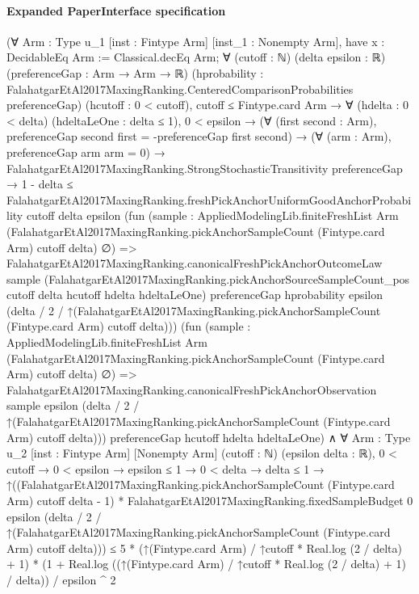 \documentclass[10pt]{article}
\begin{document}
\paragraph{Expanded PaperInterface specification}
\begin{ReviewVerbatim}
(∀ {Arm : Type u_1} [inst : Fintype Arm] [inst_1 : Nonempty Arm],
    have x : DecidableEq Arm := Classical.decEq Arm;
    ∀ (cutoff : ℕ) (delta epsilon : ℝ) (preferenceGap : Arm → Arm → ℝ)
      (hprobability : FalahatgarEtAl2017MaxingRanking.CenteredComparisonProbabilities preferenceGap)
      (hcutoff : 0 < cutoff),
      cutoff ≤ Fintype.card Arm →
        ∀ (hdelta : 0 < delta) (hdeltaLeOne : delta ≤ 1),
          0 < epsilon →
            (∀ (first second : Arm), preferenceGap second first = -preferenceGap first second) →
              (∀ (arm : Arm), preferenceGap arm arm = 0) →
                FalahatgarEtAl2017MaxingRanking.StrongStochasticTransitivity preferenceGap →
                  1 - delta ≤
                    FalahatgarEtAl2017MaxingRanking.freshPickAnchorUniformGoodAnchorProbability cutoff delta epsilon
                      (fun
                          (sample :
                            AppliedModelingLib.finiteFreshList Arm
                              (FalahatgarEtAl2017MaxingRanking.pickAnchorSampleCount (Fintype.card Arm) cutoff delta)
                              ∅) =>
                        FalahatgarEtAl2017MaxingRanking.canonicalFreshPickAnchorOutcomeLaw sample
                          (FalahatgarEtAl2017MaxingRanking.pickAnchorSourceSampleCount_pos cutoff delta hcutoff hdelta
                            hdeltaLeOne)
                          preferenceGap hprobability epsilon
                          (delta / 2 /
                            ↑(FalahatgarEtAl2017MaxingRanking.pickAnchorSampleCount (Fintype.card Arm) cutoff delta)))
                      (fun
                          (sample :
                            AppliedModelingLib.finiteFreshList Arm
                              (FalahatgarEtAl2017MaxingRanking.pickAnchorSampleCount (Fintype.card Arm) cutoff delta)
                              ∅) =>
                        FalahatgarEtAl2017MaxingRanking.canonicalFreshPickAnchorObservation sample epsilon
                          (delta / 2 /
                            ↑(FalahatgarEtAl2017MaxingRanking.pickAnchorSampleCount (Fintype.card Arm) cutoff delta)))
                      preferenceGap hcutoff hdelta hdeltaLeOne) ∧
  ∀ {Arm : Type u_2} [inst : Fintype Arm] [Nonempty Arm] (cutoff : ℕ) (epsilon delta : ℝ),
    0 < cutoff →
      0 < epsilon →
        epsilon ≤ 1 →
          0 < delta →
            delta ≤ 1 →
              ↑((FalahatgarEtAl2017MaxingRanking.pickAnchorSampleCount (Fintype.card Arm) cutoff delta - 1) *
                    FalahatgarEtAl2017MaxingRanking.fixedSampleBudget 0 epsilon
                      (delta / 2 /
                        ↑(FalahatgarEtAl2017MaxingRanking.pickAnchorSampleCount (Fintype.card Arm) cutoff delta))) ≤
                5 * (↑(Fintype.card Arm) / ↑cutoff * Real.log (2 / delta) + 1) *
                    (1 + Real.log ((↑(Fintype.card Arm) / ↑cutoff * Real.log (2 / delta) + 1) / delta)) /
                  epsilon ^ 2
\end{ReviewVerbatim}
\end{document}
